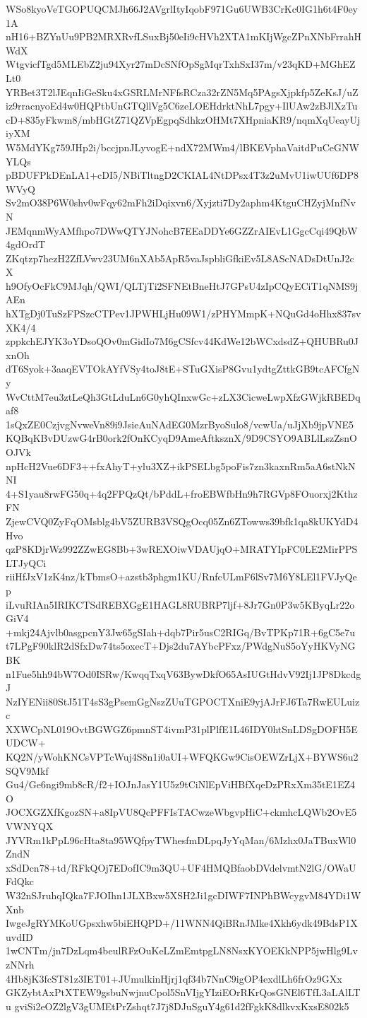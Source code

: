 WSo8kyoVeTGOPUQCMJh66J2AVgrlItyIqobF971Gu6UWB3CrKc0IG1h6t4F0ey1A
nH16+BZYnUu9PB2MRXRvfLSuxBj50eIi9cHVh2XTA1mKIjWgcZPnXNbFrrahHWdX
WtgvicfTgd5MLEbZ2ju94Xyr27mDcSNfOpSgMqrTxhSxI37m/v23qKD+MGhEZLt0
YRBet3T2lJEqnIiGeSku4xGSRLMrNFfsRCza32rZN5Mq5PAgsXjpkfp5ZeKsJ/uZ
iz9rracnyoEd4w0HQPtbUnGTQllVg5C6zeLOEHdrktNhL7pgy+IlUAw2zBJlXzTu
cD+835yFkwm8/mbHGtZ71QZVpEgpqSdhkzOHMt7XHpniaKR9/nqmXqUeayUjiyXM
W5MdYKg759JHp2i/bccjpnJLyvogE+ndX72MWm4/lBKEVphaVaitdPuCeGNWYLQs
pBDUFPkDEnLA1+cDI5/NBiTltngD2CKIAL4NtDPsx4T3z2uMvU1iwUUf6DP8WVyQ
Sv2mO38P6W0shv0wFqy62mFh2iDqixvn6/Xyjzti7Dy2aphm4KtguCHZyjMnfNvN
JEMqnmWyAMfhpo7DWwQTYJNohcB7EEaDDYe6GZZrAIEvL1GgcCqi49QbW4gdOrdT
ZKqtzp7hezH2ZfLVwv23UM6nXAb5ApR5vaJspbliGfkiEv5L8AScNADsDtUnJ2cX
h9OfyOcFkC9MJqh/QWI/QLTjTi2SFNEtBneHtJ7GPsU4zIpCQyECiT1qNMS9jAEn
hXTgDj0TuSzFPSzcCTPev1JPWHLjHu09W1/zPHYMmpK+NQuGd4oHhx837svXK4/4
zppkchEJYK3oYDsoQOv0mGidIo7M6gCSfcv44KdWe12bWCxdsdZ+QHUBRu0JxnOh
dT6Syok+3aaqEVTOkAYfVSy4toJ8tE+STuGXisP8Gvu1ydtgZttkGB9tcAFCfgNy
WvCttM7eu3ztLeQh3GtLduLn6G0yhQInxwGc+zLX3CicweLwpXfzGWjkRBEDqaf8
1sQxZE0CzjvgNvweVn89i9JsieAuNAdEG0MzrByoSulo8/vcwUa/uJjXb9jpVNE5
KQBqKBvDUzwG4rB0ork2fOnKCyqD9AmeAftksznX/9D9CSYO9ABLlLszZsnOOJVk
npHcH2Vue6DF3++fxAhyT+ylu3XZ+ikPSELbg5poFis7zn3kaxnRm5aA6stNkNNI
4+S1yau8rwFG50q+4q2FPQzQt/bPddL+froEBWfbHn9h7RGVp8FOuorxj2KthzFN
ZjewCVQ0ZyFqOMsblg4bV5ZURB3VSQgOcq05Zn6ZTowws39bfk1qa8kUKYdD4Hvo
qzP8KDjrWz992ZZwEG8Bb+3wREXOiwVDAUjqO+MRATYIpFC0LE2MirPPSLTJyQCi
riiHfJxV1zK4nz/kTbmsO+azstb3phgm1KU/RnfcULmF6lSv7M6Y8LEl1FVJyQep
iLvuRIAn5IRIKCTSdREBXGgE1HAGL8RUBRP7ljf+8Jr7Gn0P3w5KByqLr22oGiV4
+mkj24Ajvlb0asgpcnY3Jw65gSIah+dqb7Pir5usC2RIGq/BvTPKp71R+6gC5e7u
t7LPgF90klR2dSfxDw74ts5oxecT+Djs2du7AYbcPFxz/PWdgNuS5oYyHKVyNGBK
n1Fue5hh94bW7Od0ISRw/KwqqTxqV63BywDkfO65AsIUGtHdvV92Ij1JP8DkcdgJ
NzIYENii80StJ51T4sS3gPsemGgNszZUuTGPOCTXniE9yjAJrFJ6Ta7RwEULuizc
XXWCpNL019OvtBGWGZ6pmnST4ivmP31plPlfE1L46IDY0htSnLDSgDOFH5EUDCW+
KQ2N/yWohKNCsVPTcWuj4S8n1i0aUI+WFQKGw9CisOEWZrLjX+BYWS6u2SQV9Mkf
Gu4/Ge6ngi9mb8cR/f2+IOJnJasY1U5z9tCiNlEpViHBfXqeDzPRxXm35tE1EZ4O
JOCXGZXfKgozSN+a8IpVU8QcPFFIsTACwzeWbgvpHiC+ckmhcLQWb2OvE5VWNYQX
JYVRm1kPpL96cHta8ta95WQfpyTWhesfmDLpqJyYqMan/6Mzhx0JaTBuxWl0ZndN
xSdDcn78+td/RFkQOj7EDofIC9m3QU+UF4HMQBfaobDVdelvmtN2lG/OWaUFdQkc
W32nSJruhqIQka7FJOIhn1JLXBxw5XSH2Ji1gcDIWF7INPhBWcygvM84YDi1WXnb
IwgeJgRYMKoUGpsxhw5biEHQPD+/11WNN4QiBRnJMke4Xkh6ydk49BdsP1XuvdID
1wCNTm/jn7DzLqm4beulRFzOuKeLZmEmtpgLN8NsxKYOEKkNPP5jwHlg9LvzNNrh
4Hb8jK3fcST81z3IET01+JUmulkinHjrj1qf34b7NnC9igOP4exdlLh6frOz9GXx
GKZybtAxPtXTEW9gsbuNwjnuCpol5SnVIjgYIziEOrRKrQosGNEl6TfL3aLAlLTu
gviSi2eOZ2lgV3gUMEtPrZshqt7J7j8DJuSguY4g61d2fFgkK8dlkvxKxsE802k5
